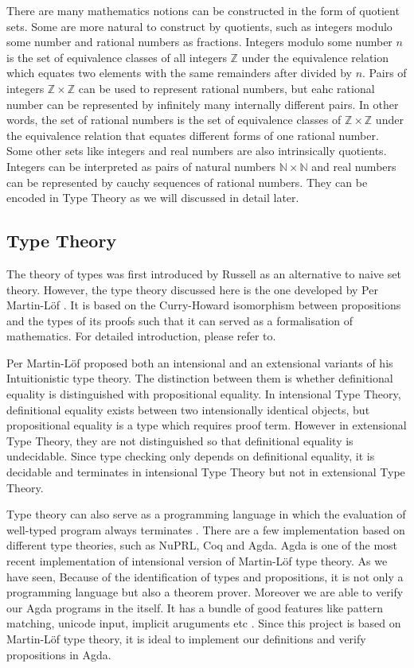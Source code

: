 \documentclass[envcountsame]{llncs}
\newcommand{\N}{\mathbb{N}}
\newcommand{\Z}{\mathbb{Z}}
\newcommand{\itt}{intensional Type Theory}
\newcommand{\ett}{extensional Type Theory}
\newcommand{\mltt}{Martin-L\"{o}f type theory}
\begin{document}

There are many mathematics notions can be constructed in the form of
quotient sets. Some are more natural to construct by quotients, such as integers modulo some
number and rational numbers as fractions. Integers modulo some number
$n$ is the set of equivalence classes of all integers $\Z$ under the equivalence relation
which equates two elements with the same remainders after divided by
$n$. Pairs of integers $\Z \times \Z$ can be used to represent rational numbers, but
eahc rational number can be represented by infinitely many internally
different pairs. In other words, the set of rational numbers is the
set of equivalence classes of $\Z \times \Z$ under the equivalence relation that equates
different forms of one rational number. Some other sets like
integers and real numbers are also intrinsically
quotients. Integers can be interpreted as pairs of natural numbers
$\N \times \N$ and real numbers can be represented by cauchy sequences of
rational numbers. They can be encoded in Type Theory as we will
discussed in detail later.

\subsection{Type Theory}

The theory of types was first introduced by Russell \cite{rus:1903} as
an alternative to naive set theory. However, the type theory discussed
here is the one developed by Per Martin-L\"{o}f \cite{per:71,per:82}. It is based
on the Curry-Howard isomorphism between propositions and the types of
its proofs such that it can served as a formalisation of
mathematics. For detailed introduction, please refer to\cite{nor:00}.


Per Martin-L\"{o}f proposed both an intensional and an extensional
variants of his Intuitionistic type theory. The distinction between them is whether definitional equality is
distinguished with propositional equality. In \itt{}, definitional equality exists
between two intensionally identical objects, but propositional
equality is a type which requires proof term. However
in \ett{}, they are not distinguished so that definitional equality is
undecidable. Since type checking only depends on definitional
equality\cite{alt:99}, it is decidable and terminates in \itt{} but
not in \ett{}.

Type theory can also serve as a programming language in
which the evaluation of well-typed program always terminates
\cite{nor:90}. There are a few implementation based on different type theories, such as
NuPRL, Coq and Agda. Agda is one of the most recent implementation of
intensional version of \mltt{}. As we have seen, Because of the identification of types
and propositions, it is not only a programming language but also a
theorem prover. Moreover we are able to verify our Agda programs in
the itself. It has a bundle of good features like pattern matching,
unicode input, implicit aruguments etc \cite{bov:09}. Since this
project is based on \mltt{}, it is ideal to implement our definitions
and verify propositions in Agda.
\end{document}
